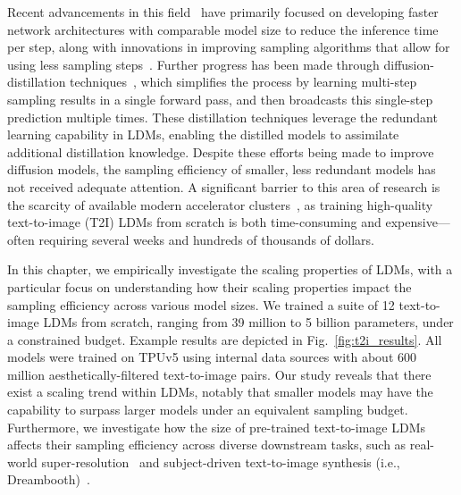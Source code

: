 Recent advancements in this field~\cite{li2023snapfusion, zhao2023mobilediffusion, peebles2023scalable, kim2023bk, kim2023architectural, choi2023squeezing} have primarily focused on developing faster network architectures with comparable model size to reduce the inference time per step, along with innovations in improving sampling algorithms that allow for using less sampling steps~\cite{song2020denoising, dockhorn2022genie, karras2022elucidating, lu2022dpm, liu2023instaflow, xu2023ufogen}.
%
Further progress has been made through diffusion-distillation techniques~\cite{luhman2021knowledge, salimans2022progressive, song2023consistency, sauer2023adversarial, gu2023boot, mei2023conditional}, which simplifies the process by learning multi-step sampling results in a single forward pass, and then broadcasts this single-step prediction multiple times.
%
These distillation techniques leverage the redundant learning capability in LDMs, enabling the distilled models to assimilate additional distillation knowledge.
%
Despite these efforts being made to improve diffusion models, the sampling efficiency of smaller, less redundant models has not received adequate attention.
%
A significant barrier to this area of research is the scarcity of available modern accelerator clusters~\cite{jouppi2023tpu}, as training high-quality text-to-image (T2I) LDMs from scratch is both time-consuming and expensive---often requiring several weeks and hundreds of thousands of dollars.


In this chapter, we empirically investigate the scaling properties of LDMs, with a particular focus on understanding how their scaling properties impact the sampling efficiency across various model sizes.
%
We trained a suite of 12 text-to-image LDMs from scratch, ranging from 39 million to 5 billion parameters, under a constrained budget. Example results are depicted in Fig.~\ref{fig:t2i_results}.
All models were trained on TPUv5 using internal data sources with about 600 million aesthetically-filtered text-to-image pairs.
%
Our study reveals that there exist a scaling trend within LDMs, notably that smaller models may have the capability to surpass larger models under an equivalent sampling budget.
%
Furthermore, we investigate how the size of pre-trained text-to-image LDMs affects their sampling efficiency across diverse downstream tasks, such as real-world super-resolution~\cite{saharia2022image, sahak2023denoising} and subject-driven text-to-image synthesis (i.e., Dreambooth)~\cite{ruiz2023dreambooth}.

